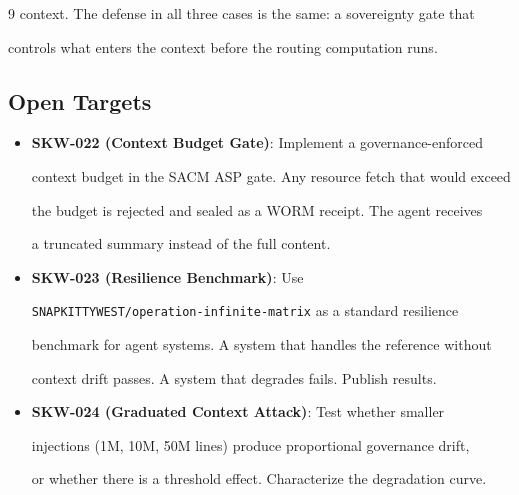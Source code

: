 \documentclass[11pt]{article}
\theoremstyle{definition}
\begin{document}
\begin{thebibliography}{9}
context. The defense in all three cases is the same: a sovereignty gate that

controls what enters the context before the routing computation runs.



\subsection{Open Targets}



\begin{itemize}

  \item \textbf{SKW-022 (Context Budget Gate)}: Implement a governance-enforced

    context budget in the SACM ASP gate. Any resource fetch that would exceed

    the budget is rejected and sealed as a WORM receipt. The agent receives

    a truncated summary instead of the full content.

  \item \textbf{SKW-023 (Resilience Benchmark)}: Use

    \texttt{SNAPKITTYWEST/operation-infinite-matrix} as a standard resilience

    benchmark for agent systems. A system that handles the reference without

    context drift passes. A system that degrades fails. Publish results.

  \item \textbf{SKW-024 (Graduated Context Attack)}: Test whether smaller

    injections (1M, 10M, 50M lines) produce proportional governance drift,

    or whether there is a threshold effect. Characterize the degradation curve.

\end{itemize}










\end{thebibliography}
\end{document}
